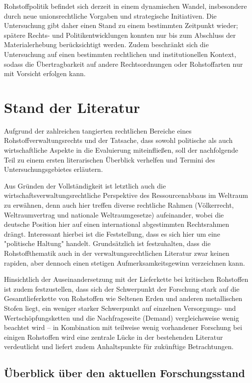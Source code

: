 \documentclass[12pt,a4paper,oneside]{book} %
\begin{document}
Rohstoffpolitik befindet sich derzeit in einem dynamischen Wandel, insbesondere durch neue unionsrechtliche Vorgaben und strategische Initiativen. Die Untersuchung gibt daher einen Stand zu einem bestimmten Zeitpunkt wieder; spätere Rechts- und Politikentwicklungen konnten nur bis zum Abschluss der Materialerhebung berücksichtigt werden. Zudem beschränkt sich die Untersuchung auf einen bestimmten rechtlichen und institutionellen Kontext, sodass die Übertragbarkeit auf andere Rechtsordnungen oder Rohstoffarten nur mit Vorsicht erfolgen kann.

\section{Stand der Literatur}
Aufgrund der zahlreichen tangierten rechtlichen Bereiche eines Rohstoffverwaltungsrechts und der Tatsache, dass sowohl politische als auch wirtschaftliche Aspekte in die Evaluierung miteinfließen, soll der nachfolgende Teil zu einem ersten literarischen Überblick verhelfen und Termini des Untersuchungsgebietes erläutern.


Aus Gründen der Vollständigkeit ist letztlich auch die wirtschaftsverwaltungsrechtliche Perspektive des Ressourcenabbaus im Weltraum zu erwähnen, denn auch hier treffen diverse rechtliche Rahmen (Völkerrecht, Weltraumvertrag und nationale Weltraumgesetze) aufeinander, wobei die deutsche Position hier auf einen international abgestimmten Rechtsrahmen drängt. Interessant hierbei ist die Feststellung, dass es sich hier um eine "politische Haltung" handelt.
Grundsätzlich ist festzuhalten, dass die Rohstoffthematik auch in der verwaltungsrechtlichen Literatur zwar keinen rapiden, aber dennoch einen stetigen Aufmerksamkeitsgewinn verzeichnen kann.

Hinsichtlich der Auseinandersetzung mit der Lieferkette bei kritischen Rohstoffen ist zudem festzustellen, dass sich der Schwerpunkt der Forschung stark auf die Gesamtlieferkette von Rohstoffen wie Seltenen Erden und anderen metallischen Stofen liegt, ein weniger starker Schwerpunkt auf einzelnen Versorgungs- und Wertschöpfungsketten und die Nachfrageseite (Demand) vergleichsweise wenig beachtet wird -- in Kombination mit teilweise wenig vorhandener Forschung bei einigen Rohstoffen wird eine zentrale Lücke in der bestehenden Literatur verdeutlicht und liefert zudem Anhaltspunkte für zukünftige Betrachtungen.\autocite{Resilience of Critical Minerals Supply Chain, S. 7}

\subsection{Überblick über den aktuellen Forschungsstand}
\end{document}
